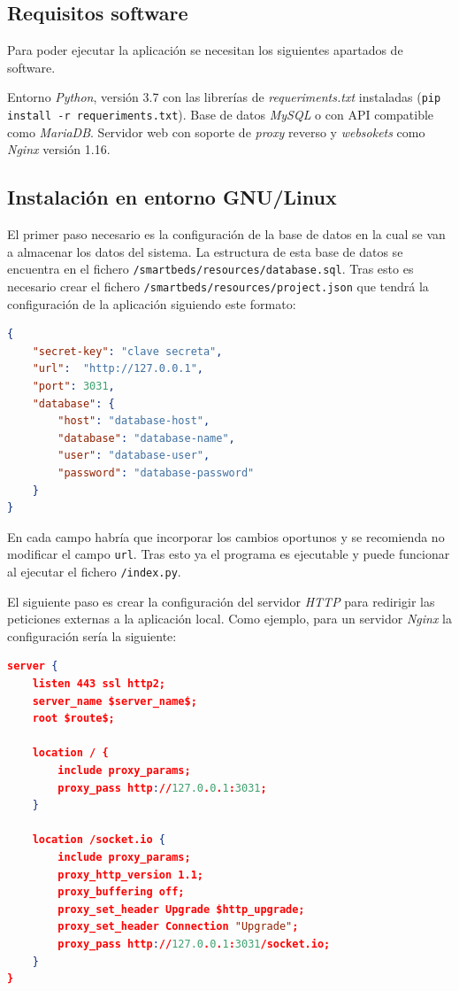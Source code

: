 \subsection{Requisitos software}

Para poder ejecutar la aplicación se necesitan los siguientes apartados de software.

Entorno \textit{Python}, versión 3.7 con las librerías de \textit{requeriments.txt} instaladas (\texttt{pip install -r requeriments.txt}).
Base de datos \textit{MySQL} o con API compatible como \textit{MariaDB}. Servidor web con soporte de \textit{proxy} reverso y \textit{websokets} como \textit{Nginx} versión 1.16.

\subsection{Instalación en entorno GNU/Linux}

El primer paso necesario es la configuración de la base de datos en la cual se van a almacenar los datos del sistema. La estructura de esta base de datos se encuentra en el fichero \texttt{/smartbeds/resources/database.sql}. Tras esto es necesario crear el fichero \texttt{/smartbeds/resources/project.json} que tendrá la configuración de la aplicación siguiendo este formato:

\begin{lstlisting}[language=JSON]
{
	"secret-key": "clave secreta",
	"url":  "http://127.0.0.1",
	"port": 3031,
	"database": {
		"host": "database-host",
		"database": "database-name",
		"user": "database-user",
		"password": "database-password"
	}
}
\end{lstlisting}

En cada campo habría que incorporar los cambios oportunos y se recomienda no modificar el campo \texttt{url}. Tras esto ya el programa es ejecutable y puede funcionar al ejecutar el fichero \texttt{/index.py}.

El siguiente paso es crear la configuración del servidor \textit{HTTP} para redirigir las peticiones externas a la aplicación local. Como ejemplo, para un servidor \textit{Nginx} la configuración sería la siguiente:

\begin{lstlisting}[language=JSON]
server {
	listen 443 ssl http2;
	server_name $server_name$;
	root $route$;
	
	location / {
		include proxy_params;
		proxy_pass http://127.0.0.1:3031;
	}
	
	location /socket.io {
		include proxy_params;
		proxy_http_version 1.1;
		proxy_buffering off;
		proxy_set_header Upgrade $http_upgrade;
		proxy_set_header Connection "Upgrade";
		proxy_pass http://127.0.0.1:3031/socket.io;
	}
}
\end{lstlisting}

